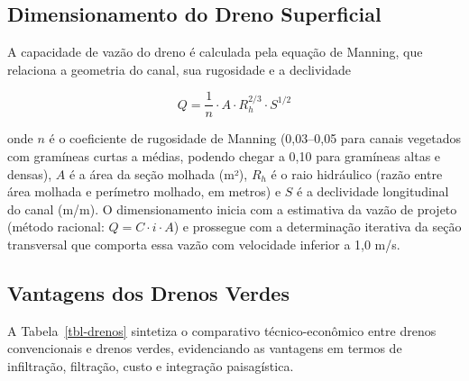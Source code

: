 \documentclass[
  portuguese,
  11pt,
  a4paper,
  open=any]{scrbook}
\begin{document}
\subsection{Dimensionamento do Dreno
Superficial}\label{dimensionamento-do-dreno-superficial}

A capacidade de vazão do dreno é calculada pela equação de Manning, que
relaciona a geometria do canal, sua rugosidade e a declividade

\[
Q = \frac{1}{n} \cdot A \cdot R_h^{2/3} \cdot S^{1/2}
\]

onde \(n\) é o coeficiente de rugosidade de Manning (0,03--0,05 para
canais vegetados com gramíneas curtas a médias, podendo chegar a 0,10
para gramíneas altas e densas), \(A\) é a área da seção molhada (m²),
\(R_h\) é o raio hidráulico (razão entre área molhada e perímetro
molhado, em metros) e \(S\) é a declividade longitudinal do canal (m/m).
O dimensionamento inicia com a estimativa da vazão de projeto (método
racional: \(Q = C \cdot i \cdot A\)) e prossegue com a determinação
iterativa da seção transversal que comporta essa vazão com velocidade
inferior a 1,0 m/s.

\subsection{Vantagens dos Drenos
Verdes}\label{vantagens-dos-drenos-verdes}

A Tabela~\ref{tbl-drenos} sintetiza o comparativo técnico-econômico
entre drenos convencionais e drenos verdes, evidenciando as vantagens em
termos de infiltração, filtração, custo e integração paisagística.
\end{document}
